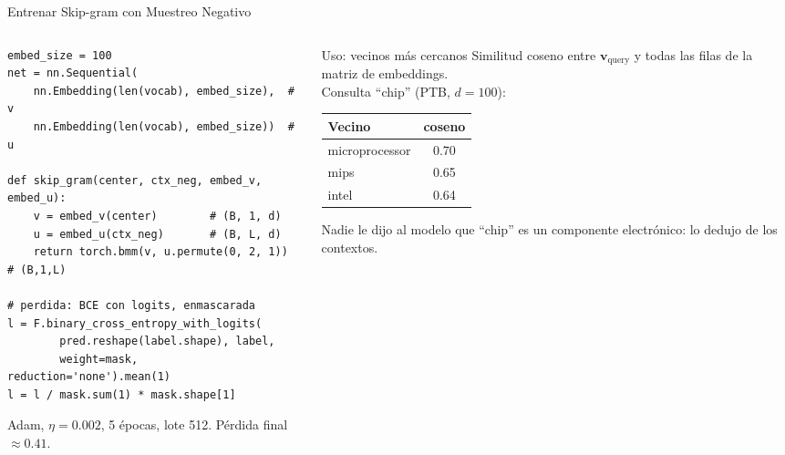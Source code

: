 \documentclass[aspectratio=169, 10pt]{beamer}
\begin{document}
\begin{frame}[fragile]{Entrenar Skip-gram con Muestreo Negativo}

	\begin{columns}[T]
		\begin{column}{0.55\textwidth}
			\begin{tcolorbox}[codebox]
\scriptsize
\begin{verbatim}
embed_size = 100
net = nn.Sequential(
    nn.Embedding(len(vocab), embed_size),  # v
    nn.Embedding(len(vocab), embed_size))  # u

def skip_gram(center, ctx_neg, embed_v, embed_u):
    v = embed_v(center)        # (B, 1, d)
    u = embed_u(ctx_neg)       # (B, L, d)
    return torch.bmm(v, u.permute(0, 2, 1))  # (B,1,L)

# perdida: BCE con logits, enmascarada
l = F.binary_cross_entropy_with_logits(
        pred.reshape(label.shape), label,
        weight=mask, reduction='none').mean(1)
l = l / mask.sum(1) * mask.shape[1]
\end{verbatim}
			\end{tcolorbox}
			\scriptsize Adam, $\eta=0.002$, 5 \'epocas, lote 512. P\'erdida final $\approx 0.41$.
		\end{column}

		\begin{column}{0.42\textwidth}
			\begin{block}{Uso: vecinos m\'as cercanos}
				\small
				Similitud coseno entre $\mathbf{v}_{\text{query}}$ y todas las filas de la matriz de embeddings.\\[3pt]
				Consulta ``chip'' (PTB, $d=100$):
				\begin{center}
					\begin{tabular}{@{}lc@{}}
						\toprule
						Vecino & coseno \\
						\midrule
						microprocessor & 0.70 \\
						mips & 0.65 \\
						intel & 0.64 \\
						\bottomrule
					\end{tabular}
				\end{center}
			\end{block}

			{\small Nadie le dijo al modelo que ``chip'' es un componente electr\'onico: lo dedujo de los contextos.}
		\end{column}
	\end{columns}

\end{frame}
\end{document}
